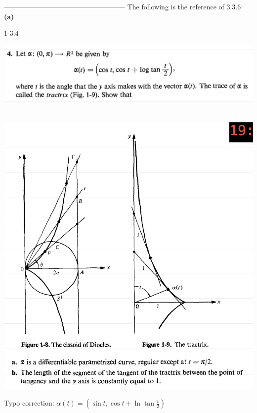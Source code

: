 \documentclass{report}
\begin{document}
\vspace{10cm}

----------------------------------------------------- The following is the reference of 3.3.6  \textbf{(a)}
\begin{question}{1-3:4}{}
\includegraphics[height=4cm,width=18cm]{3.png}
\includegraphics[height=15cm,width=18cm]{2.png}
Typo correction: $\alpha (t)=(\sin t,\cos t + \ln \tan \frac{t}{2})$
\end{question}
\end{document}
